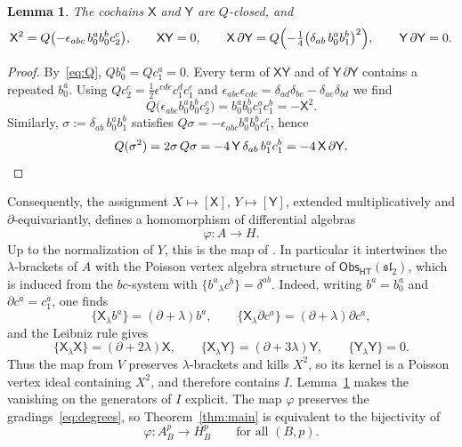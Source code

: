 \documentclass[11pt]{amsart}
\numberwithin{equation}{section}
\renewcommand{\S}{\mbox{$\mathsection$}}
\newtheorem{lemma}[theorem]{Lemma}
\theoremstyle{definition}
\theoremstyle{remark}
\newcommand{\sltwo}{\mathfrak{sl}_2}
\newcommand{\dd}{\partial}
\newcommand{\Obs}{\mathsf{Obs}_{\mathsf{HT}}}
\newcommand{\Xc}{\mathsf{X}}
\newcommand{\Yc}{\mathsf{Y}}
\begin{document}
\begin{lemma}\label{lem:relations}
The cochains $\Xc$ and $\Yc$ are $Q$-closed, and
\begin{equation}\label{eq:relations}
\Xc^2=Q\bigl(-\epsilon_{abc}\,b_0^ab_0^bc_2^c\bigr),\qquad \Xc\Yc=0,\qquad
\Xc\,\dd\Yc=Q\Bigl(-\tfrac14\bigl(\delta_{ab}\,b_0^ab_1^b\bigr)^2\Bigr),\qquad \Yc\,\dd\Yc=0 .
\end{equation}
\end{lemma}

\begin{proof}
By~\eqref{eq:Q}, $Qb_0^a=Qc_1^a=0$. Every term of $\Xc\Yc$ and of $\Yc\,\dd\Yc$ contains a repeated $b_0^a$. Using $Qc_2^c=\frac12\epsilon^{cde}c_1^dc_1^e$ and $\epsilon_{abc}\epsilon_{cde}=\delta_{ad}\delta_{be}-\delta_{ae}\delta_{bd}$ we find
\begin{equation}\label{eq:X2-exact}
Q\bigl(\epsilon_{abc}b_0^ab_0^bc_2^c\bigr)=b_0^ab_0^bc_1^ac_1^b=-\Xc^2 .
\end{equation}
Similarly, $\sigma:=\delta_{ab}\,b_0^ab_1^b$ satisfies $Q\sigma=-\epsilon_{abc}b_0^ab_0^bc_1^c$, hence
\begin{equation}\label{eq:XdY-exact}
Q(\sigma^2)=2\sigma\,Q\sigma=-4\,\Yc\,\delta_{ab}\,b_1^ac_1^b=-4\,\Xc\,\dd\Yc .\qedhere
\end{equation}
\end{proof}

Consequently, the assignment $X\mapsto[\Xc]$, $Y\mapsto[\Yc]$, extended multiplicatively and $\dd$-equivariantly, defines a homomorphism of differential algebras
\begin{equation}\label{eq:phi}
\varphi:A\longrightarrow H .
\end{equation}
Up to the normalization of $Y$, this is the map of \cite[\S3.6]{Kha26}. In particular it intertwines the $\lambda$-brackets of $A$ with the Poisson vertex algebra structure of $\Obs(\sltwo)$, which is induced from the $bc$-system with $\{b^a{}_\lambda c^b\}=\delta^{ab}$. Indeed, writing $b^a=b_0^a$ and $\dd c^a=c_1^a$, one finds
\begin{equation}\label{eq:X-ghosts}
\{\Xc_\lambda b^a\}=(\dd+\lambda)b^a,\qquad\{\Xc_\lambda\dd c^a\}=(\dd+\lambda)\dd c^a,
\end{equation}
and the Leibniz rule gives
\begin{equation}\label{eq:XY-brackets-cochains}
\{\Xc_\lambda\Xc\}=(\dd+2\lambda)\Xc,\qquad\{\Xc_\lambda\Yc\}=(\dd+3\lambda)\Yc,\qquad\{\Yc_\lambda\Yc\}=0.
\end{equation}
Thus the map from $V$ preserves $\lambda$-brackets and kills $X^2$, so its kernel is a Poisson vertex ideal containing $X^2$, and therefore contains $I$. Lemma~\ref{lem:relations} makes the vanishing on the generators of $I$ explicit. The map $\varphi$ preserves the gradings~\eqref{eq:degrees}, so Theorem~\ref{thm:main} is equivalent to the bijectivity of
\begin{equation}\label{eq:phi-Bp}
\varphi:A_B^p\longrightarrow H_B^p\qquad\text{for all }(B,p).
\end{equation}
\end{document}
